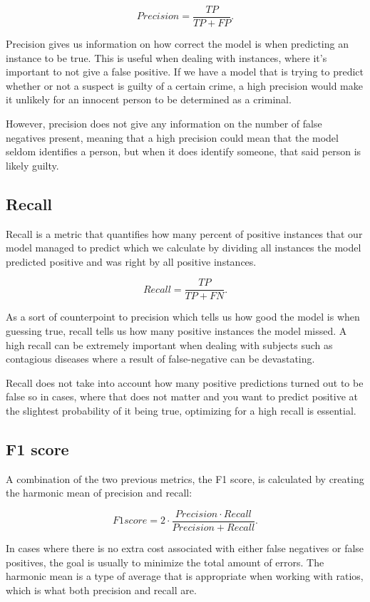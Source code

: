 \documentclass[nofilelist]{cslthse-msc}
\begin{document}
$$ Precision = \frac{TP}{TP + FP}.$$

Precision gives us information on how correct the model is when predicting an instance to be true. This is useful when dealing with instances, where it's important to not give a false positive. If we have a model that is trying to predict whether or not a suspect is guilty of a certain crime, a high precision would make it unlikely for an innocent person to be determined as a criminal. 

However, precision does not give any information on the number of false negatives present, meaning that a high precision could mean that the model seldom identifies a person, but when it does identify someone, that said person is likely guilty.

\subsection{Recall}
Recall is a metric that quantifies how many percent of positive instances that our model managed to predict which we calculate by dividing all instances the model predicted positive and was right by all positive instances.

$$ Recall =\frac{TP}{TP + FN}.$$

As a sort of counterpoint to precision which tells us how good the model is when guessing true, recall tells us how many positive instances the model missed. A high recall can be extremely important when dealing with subjects such as contagious diseases where a result of false-negative can be devastating. 

Recall does not take into account how many positive predictions turned out to be false so in cases, where that does not matter and you want to predict positive at the slightest probability of it being true, optimizing for a high recall is essential.


\subsection{F1 score}
A combination of the two previous metrics, the F1 score, is calculated by creating the harmonic mean of precision and recall:

$$ F1score = 2 \cdot \frac{Precision \cdot Recall}{Precision + Recall}.$$

In cases where there is no extra cost associated with either false negatives or false positives, the goal is usually to minimize the total amount of errors. The harmonic mean is a type of average that is appropriate when working with ratios, which is what both precision and recall are. 
\end{document}
